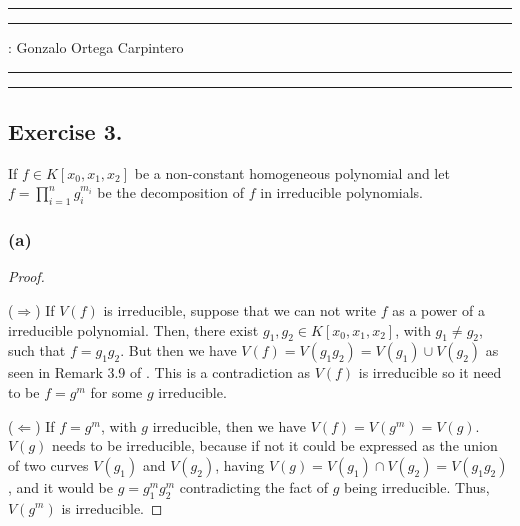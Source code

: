 \documentclass[11pt,a4paper]{article}
\begin{document}
\hrule\hrule
\vspace{1mm}


\vspace{1mm}

 : Gonzalo Ortega Carpintero
\vspace{2mm}

\hrule\hrule

\subsection*{Exercise 3.}

  If $ f \in K[x_0, x_1, x_2] $ be a non-constant homogeneous polynomial and let $ f = \prod_{i=1}^n g_i^{m_i} $ be the decomposition of $ f $ in irreducible polynomials.

\subsubsection*{(a)}
  \begin{proof} \

    \vspace{1mm}
    ($\Rightarrow$)
    If $ V(f) $ is irreducible, suppose that we can not write $ f $ as a power of a irreducible polynomial. Then, there exist $ g_1, g_2 \in K[x_0, x_1, x_2] $, with $ g_1 \neq g_2 $, such that $ f = g_1 g_2 $. But then we have $ V(f) = V(g_1 g_2) = V(g_1) \cup V(g_2) $ as seen in Remark 3.9 of \cite{gath}. This is a contradiction as $ V(f) $ is irreducible so it need to be $ f = g^m $ for some $g$ irreducible.

    \vspace{1mm}
    ($\Leftarrow$)
    If $ f = g^m $, with $ g $ irreducible, then we have $ V(f) = V(g^m) = V(g) $. $ V(g) $ needs to be irreducible, because if not it could be expressed as the union of two curves $ V(g_1) $ and $ V(g_2) $, having $ V(g) = V(g_1) \cap V(g_2) = V(g_1 g_2) $, and it would be $ g =  g_1^m g_2^m $ contradicting the fact of $ g $ being irreducible. Thus, $ V(g^m) $ is irreducible.
  \end{proof}
\end{document}
